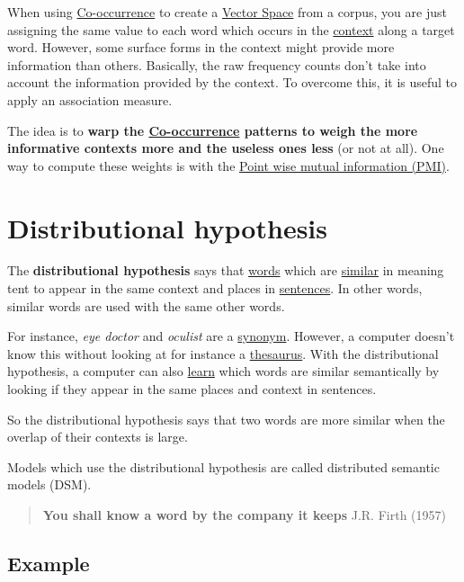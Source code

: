 \documentclass[
  11pt,
  british,
]{article}
\begin{document}
When using \href{Co-occurrence.md}{Co-occurrence} to create a
\href{Vector\%20Space.md}{Vector Space} from a corpus, you are just
assigning the same value to each word which occurs in the
\href{Context.md}{context} along a target word. However, some surface
forms in the context might provide more information than others.
Basically, the raw frequency counts don't take into account the
information provided by the context. To overcome this, it is useful to
apply an association measure.

The idea is to \textbf{warp the \href{Co-occurrence.md}{Co-occurrence}
patterns to weigh the more informative contexts more and the useless
ones less} (or not at all). One way to compute these weights is with the
\href{Point\%20wise\%20mutual\%20information\%20(PMI).md}{Point wise
mutual information (PMI)}.

\hypertarget{distributional-hypothesis}{%
\section{Distributional hypothesis}\label{distributional-hypothesis}}

The \textbf{distributional hypothesis} says that
\href{../Data/Words.md}{words} which are \href{Similarity.md}{similar}
in meaning tent to appear in the same context and places in
\href{../Data/Sentences.md}{sentences}. In other words, similar words
are used with the same other words.

For instance, \emph{eye doctor} and \emph{oculist} are a
\href{Synonyms.md}{synonym}. However, a computer doesn't know this
without looking at for instance a
\href{../Data/Thesaurus.md}{thesaurus}. With the distributional
hypothesis, a computer can also \href{../Other/Learning.md}{learn} which
words are similar semantically by looking if they appear in the same
places and context in sentences.

So the distributional hypothesis says that two words are more similar
when the overlap of their contexts is large.

Models which use the distributional hypothesis are called distributed
semantic models (DSM).

\begin{quote}
\textbf{You shall know a word by the company it keeps} J.R. Firth (1957)
\end{quote}

\hypertarget{example-1}{%
\subsection{Example}\label{example-1}}
\end{document}
